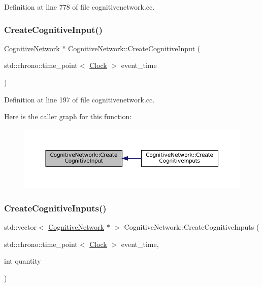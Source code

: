 Definition at line 778 of file cognitivenetwork.\+cc.

\mbox{\label{class_cognitive_network_add96197c3dc51d94d06edb480fbc4a38}} 
\subsubsection{\texorpdfstring{Create\+Cognitive\+Input()}{CreateCognitiveInput()}}
{\footnotesize\ttfamily \mbox{\hyperlink{class_cognitive_network}{Cognitive\+Network}} $\ast$ Cognitive\+Network\+::\+Create\+Cognitive\+Input (\begin{DoxyParamCaption}\item[{std\+::chrono\+::time\+\_\+point$<$ \mbox{\hyperlink{universe_8h_a0ef8d951d1ca5ab3cfaf7ab4c7a6fd80}{Clock}} $>$}]{event\+\_\+time }\end{DoxyParamCaption})}



Definition at line 197 of file cognitivenetwork.\+cc.

Here is the caller graph for this function\+:\nopagebreak
\begin{figure}[H]
\begin{center}
\leavevmode
\includegraphics[width=350pt]{class_cognitive_network_add96197c3dc51d94d06edb480fbc4a38_icgraph}
\end{center}
\end{figure}
\mbox{\label{class_cognitive_network_a0833f7b587f14e0c0778661a56bce957}} 
\subsubsection{\texorpdfstring{Create\+Cognitive\+Inputs()}{CreateCognitiveInputs()}}
{\footnotesize\ttfamily std\+::vector$<$ \mbox{\hyperlink{class_cognitive_network}{Cognitive\+Network}} $\ast$ $>$ Cognitive\+Network\+::\+Create\+Cognitive\+Inputs (\begin{DoxyParamCaption}\item[{std\+::chrono\+::time\+\_\+point$<$ \mbox{\hyperlink{universe_8h_a0ef8d951d1ca5ab3cfaf7ab4c7a6fd80}{Clock}} $>$}]{event\+\_\+time,  }\item[{int}]{quantity }\end{DoxyParamCaption})}



